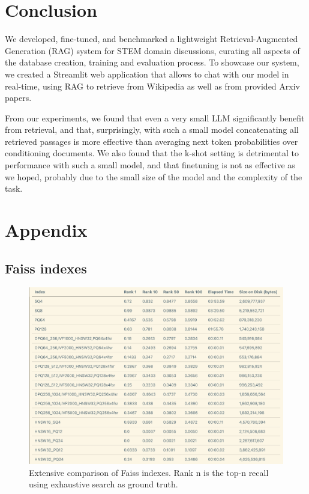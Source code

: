 \documentclass[11pt]{article}
\begin{document}
\section{Conclusion}
We developed, fine-tuned, and benchmarked a lightweight Retrieval-Augmented Generation (RAG) 
system for STEM domain discussions, curating all aspects of the database creation,
training and evaluation process. To showcase our system, we created a Streamlit web application
that allows to chat with our model in real-time, using RAG to retrieve from Wikipedia as well as from
provided Arxiv papers.

From our experiments, we found that even a very small LLM significantly benefit from retrieval, and that, 
surprisingly, with such a small model concatenating all retrieved passages is more effective than averaging
next token probabilities over conditioning documents. We also found that the k-shot setting is detrimental to
performance with such a small model, and that finetuning is not as effective as we hoped, probably due to the small
size of the model and the complexity of the task.

\newpage



\nocite{*}

\appendix

\section{Appendix}
\label{sec:appendix}

\subsection{Faiss indexes}

\begin{figure}[h]
    \centering
    \includegraphics[width=0.8\linewidth]{figures/faiss-indexes-extensive.png}
    \caption{Extensive comparison of Faiss indexes. Rank n is the top-n recall using exhaustive search as ground truth.}
    \label{fig:faiss-indexes-extensive}
\end{figure}
\end{document}
